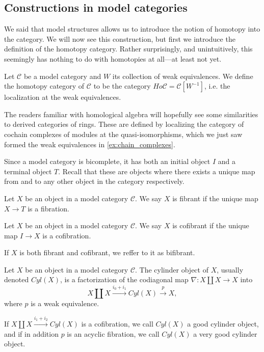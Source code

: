 \subsection{Constructions in model categories}

We said that model structures allows us to introduce the notion of homotopy into the category. We will now see this construction, but first we introduce the definition of the homotopy category. Rather surprisingly, and unintuitively, this seemingly has nothing to do with homotopies at all---at least not yet. 

\begin{definition}
Let $\mathcal{C}$ be a model category and $W$ its collection of weak equivalences. We define the homotopy category of $\mathcal{C}$ to be the category $Ho\mathcal{C} = \mathcal{C}[W^{-1}]$, i.e. the localization at the weak equivalences. 
\end{definition}

\begin{remark}
The readers familiar with homological algebra will hopefully see some similarities to derived categories of rings. These are defined by localizing the category of cochain complexes of modules at the quasi-isomorphisms, which we just saw formed the weak equivalences in \cref{ex:chain_complexes}. 
\end{remark}

Since a model category is bicomplete, it has both an initial object $I$ and a terminal object $T$. Recall that these are objects where there exists a unique map from and to any other object in the category respectively. 

\begin{definition}
Let $X$ be an object in a model category $\mathcal{C}$. We say $X$ is fibrant if the unique map $X\longrightarrow T$ is a fibration. 
\end{definition}

\begin{definition}
Let $X$ be an object in a model category $\mathcal{C}$. We say $X$ is cofibrant if the unique map $I\longrightarrow X$ is a cofibration. 
\end{definition}

If $X$ is both fibrant and cofibrant, we reffer to it as bifibrant. 



\begin{definition}
Let $X$ be an object in a model category $\mathcal{C}$. The cylinder object of $X$, usually denoted $Cyl(X)$, is a factorization of the codiagonal map $\nabla: X\coprod X\longrightarrow X$ into
\begin{equation*}
    X\coprod X\overset{i_0+i_1}\longrightarrow Cyl(X) \overset{p}\longrightarrow X,
\end{equation*} 
where $p$ is a weak equivalence. 

If $X\coprod X\overset{i_1 + i_2}\rightarrow Cyl(X)$ is a cofibration, we call $Cyl(X)$ a good cylinder object, and if in addition $p$ is an acyclic fibration, we call $Cyl(X)$ a very good cylinder object.
\end{definition}

